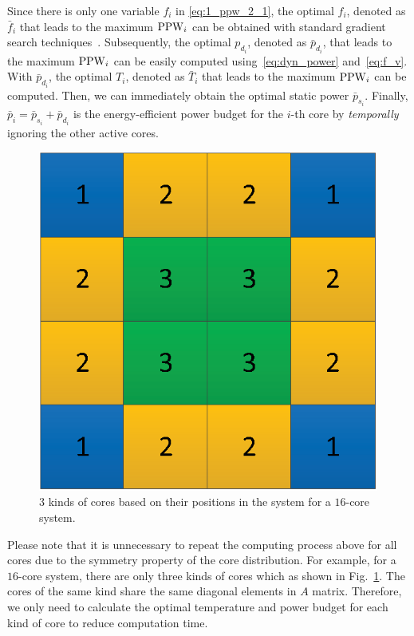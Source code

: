 Since there is only one variable $f_{i}$ in \eqref{eq:1_ppw_2_1},  the optimal $f_{i}$,
denoted as $\bar{f}_{i}$ that leads to
the maximum $\operatorname{PPW}_i$ can be obtained with standard gradient search
techniques~\cite{Boyd:Convex_BOOK'06}. Subsequently, the optimal
$p_{d_i}$, denoted as $\bar{p}_{d_i}$, that leads to the maximum $\operatorname{PPW}_i$ can
be easily computed using~\eqref{eq:dyn_power} and~\eqref{eq:f_v}.
With $\bar{p}_{d_i}$, the optimal $T_{i}$, denoted as $\bar{T}_{i}$ that leads to
the maximum $\operatorname{PPW}_i$ can be computed. Then, we can immediately
obtain the optimal static power $\bar{p}_{s_i}$. Finally, $\bar{p}_i =
\bar{p}_{s_i}+\bar{p}_{d_i}$ is the energy-efficient power
budget for the $i$-th core by \emph{temporally} ignoring the other active cores. 

\begin{figure}
\centering
\includegraphics[width=0.46\linewidth]{fig/unique_position.eps}
\caption{$3$ kinds of cores based on their positions in the system for a $16$-core system.}
\label{fig:unique_position}
\end{figure}

Please note that it is unnecessary to repeat the computing process
above for all cores due to the symmetry property of the core
distribution. For example, for a $16$-core system, there are only
three kinds of cores which as shown in
Fig.~\ref{fig:unique_position}. The cores of the same kind share the
same diagonal elements in $A$ matrix. Therefore, we only need to
calculate the optimal temperature and power budget for each kind of
core to reduce computation time.

